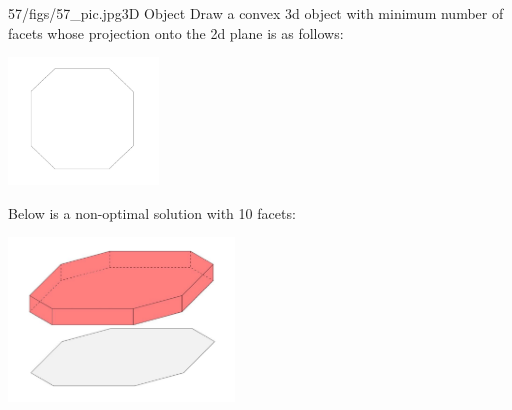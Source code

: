 \begin{problem}{57/figs/57_pic.jpg}{3D Object}  Draw a convex 3d object with minimum number of facets whose projection onto the 2d plane is as follows:
	\begin{center}
		\includegraphics[width=4cm]{57/figs/57_sol1.jpg}
	\end{center}
Below is a non-optimal solution with 10 facets:
	\begin{center}
	\includegraphics[width=6cm]{57/figs/57_sol2.png}
\end{center}

\end{problem}